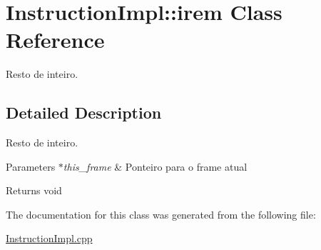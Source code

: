 \hypertarget{class_instruction_impl_1_1irem}{}\section{Instruction\+Impl\+:\+:irem Class Reference}
\label{class_instruction_impl_1_1irem}


Resto de inteiro.  




\subsection{Detailed Description}
Resto de inteiro. 


\begin{DoxyParams}{Parameters}
{\em $\ast$this\+\_\+frame} & Ponteiro para o frame atual \\
\hline
\end{DoxyParams}
\begin{DoxyReturn}{Returns}
void 
\end{DoxyReturn}


The documentation for this class was generated from the following file\+:\begin{DoxyCompactItemize}
\item 
\hyperlink{_instruction_impl_8cpp}{Instruction\+Impl.\+cpp}\end{DoxyCompactItemize}
